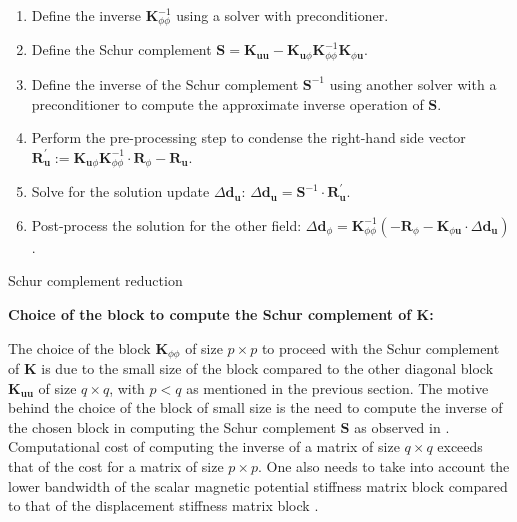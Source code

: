 \documentclass[11pt,a4paper,final]{article}
\begin{document}
\begin{algorithm}[h]
\begin{enumerate}
\item Define the inverse $\mathbf{K}_{\phi \phi}^{-1}$ using a solver with preconditioner.
\item Define the Schur complement $\mathbf{S} = \mathbf{K}_{\mathbf{u} \mathbf{u}} - \mathbf{K}_{\mathbf{u} \phi} \mathbf{K}_{\phi \phi}^{-1} \mathbf{K}_{\phi \mathbf{u}}$.
\item Define the inverse of the Schur complement $\mathbf{S}^{-1}$ using another solver with a preconditioner to compute the approximate inverse operation of $\mathbf{S}$. 
\item Perform the pre-processing step to condense the right-hand side vector $\mathbf{R}_{\mathbf{u}}^' := \mathbf{K}_{\mathbf{u} \phi} \mathbf{K}_{\phi \phi}^{-1} \cdot \mathbf{R}_{\phi} - \mathbf{R}_{\mathbf{u}}$.
\item Solve for the solution update $\Delta \mathbf{d}_{\mathbf{u}}$: $\Delta \mathbf{d}_{\mathbf{u}} = \mathbf{S}^{-1} \cdot \mathbf{R}_{\mathbf{u}}^'$.
\item Post-process the solution for the other field: $\Delta \mathbf{d}_{\phi} = \mathbf{K}_{\phi \phi}^{-1} \left( -\mathbf{R}_{\phi} - \mathbf{K}_{\phi \mathbf{u}} \cdot \Delta \mathbf{d}_{\mathbf{u}} \right)$. 
\end{enumerate}
\caption{Schur complement reduction}
\label{alg:3.1}
\end{algorithm}

\begin{large}
\noindent \textbf{Choice of the block to compute the Schur complement of $\mathbf{K}$:}\\
\end{large}
\indent The choice of the block $\mathbf{K}_{\phi \phi}$  of size $p \times p$ to proceed with the Schur complement of $\mathbf{K}$ is due to the small size of the block compared to the other diagonal block $\mathbf{K}_{\mathbf{u} \mathbf{u}}$ of size $q \times q$, with $p < q$ as mentioned in the previous section. The motive behind the choice of the block of small size is the need to compute the inverse of the chosen block in computing the Schur complement $\mathbf{S}$ as observed in . Computational cost of computing the inverse of a matrix of size $q \times q$ exceeds that of the cost for a matrix of size $p \times p$. One also needs to take into account the lower bandwidth of the scalar magnetic potential stiffness matrix block compared to that of the displacement stiffness matrix block \cite{Pelteret2016}. \newline \par 
\end{document}
